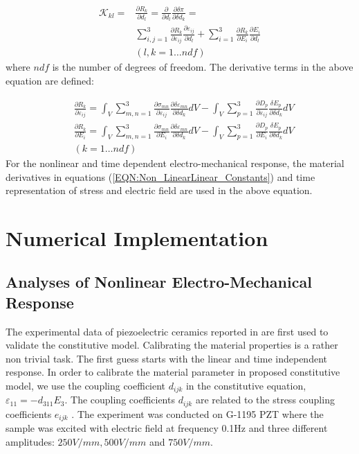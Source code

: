 \begin{equation}
\begin{aligned}
\mathcal{K}_{kl}=
& \frac{\partial R_k}{\partial d_l}= 
\frac{\partial}{\partial d_l} \frac{\partial \delta \pi}{\partial \delta d_k}= \\
& \sum_{i,j=1}^3 \frac{\partial R_k}{\partial \varepsilon_{ij}}\frac{\partial \varepsilon_{ij}}{\partial d_l}+  
 \sum_{i=1}^3 \frac{\partial R_k}{\partial E_{i}}\frac{\partial E_{i}}{\partial d_l}\\ 
& (l,k=1\dots ndf)
\end{aligned}
\label{EQN:TangentRepresentation}
\end{equation}  
where $ndf$ is the number of degrees of freedom.
The derivative terms in the above equation are defined:

\begin{equation}
\begin{aligned}
&\frac{\partial R_k}{\partial \varepsilon_{ij}}=
\int_V  
\sum_{m,n=1}^3 \frac{\partial \sigma_{mn}}{\partial \varepsilon_{ij}} \frac{\partial \delta \varepsilon_{mn}}{\partial \delta d_k}  dV-
\int_V 
\sum_{p=1}^3 \frac{\partial D_{p}}{\partial \varepsilon_{ij}}  \frac{\delta E_{p}}{\partial \delta d_k} dV  \\
&\frac{\partial R_k}{\partial E_{i}}=
\int_V  
\sum_{m,n=1}^3 \frac{\partial \sigma_{mn}}{\partial E_{i}} \frac{\partial \delta \varepsilon_{mn}}{\partial \delta d_k}  dV-
\int_V 
\sum_{p=1}^3 \frac{\partial D_{p}}{\partial E_{i}}  \frac{\delta E_{p}}{\partial \delta d_k} dV  \\
& (k=1\dots ndf)
\end{aligned}
\label{EQN:StressExplcitTangent}
\end{equation}
For the nonlinear and time dependent electro-mechanical  response, the material
derivatives in equations (\ref{EQN:Non_LinearLinear_Constants}) 
and time representation of stress and electric field are used in the above equation.

\section{Numerical Implementation}
\subsection{Analyses of Nonlinear Electro-Mechanical Response}
The experimental data of piezoelectric ceramics reported in \cite{Crawley1990} are first used to validate the constitutive model.
Calibrating the material properties is a rather non trivial task.
The first guess starts with the linear and time independent response.
In order to calibrate the material parameter in proposed constitutive model, we use the coupling coefficient $d_{ijk}$ in the constitutive equation, $\varepsilon_{11}=-d_{311}E_3$. 
The coupling coefficients $d_{ijk}$ are related to the stress coupling coefficients $e_{ijk}$ \cite{Leo2007}. 
The experiment was conducted on G-1195 PZT where the sample was excited with electric field at frequency 0.1Hz and three different amplitudes: $250 V/mm, 500 V/mm$ and $750 V/mm$.


